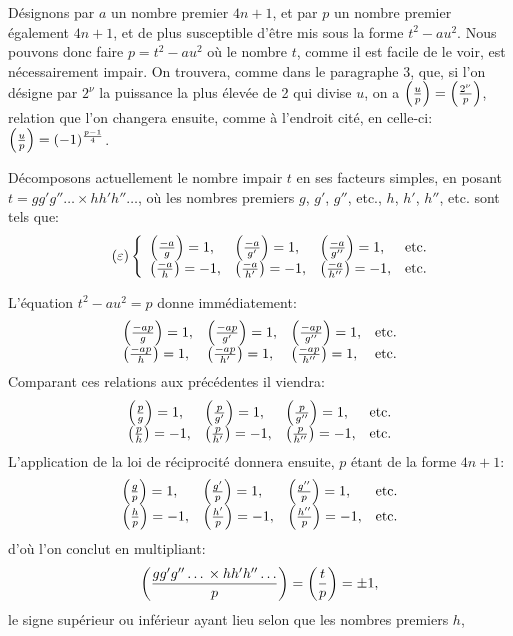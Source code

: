 \par\indent
Désignons par $a$ un nombre premier $4n+1$, et par $p$ un nombre premier également $4n+1$, et de
plus susceptible d'être mis sous la forme $t^2-au^2$. Nous pouvons donc faire $p=t^2-au^2$ où le
nombre $t$, comme il est facile de le voir, est nécessairement impair. On trouvera, comme dans le
paragraphe 3, que, si l'on désigne par $2^\nu$ la puissance la plus élevée de 2 qui divise $u$, on
a $\left(\frac{u}{p}\right)=\left(\frac{2^\nu}{p}\right)$, relation que l'on changera ensuite, comme à l'endroit cité, en
celle-ci: $\left(\frac{u}{p}\right)=(-1)^{\frac{p-1}{4}}$.
\par\indent
Décomposons actuellement le nombre impair $t$ en ses facteurs simples, en posant
$t=gg'g''\ldots{}\times hh'h''\ldots$, où les nombres premiers $g$, $g'$, $g''$, etc., $h$, $h'$,
$h''$, etc. sont tels que:
\begin{equation*}\tag{$\varepsilon$}
\left\{
\begin{array}{llll}
\left(\frac{-a}{g}\right)=1,& \left(\frac{-a}{g'}\right)=1,& \left(\frac{-a}{g''}\right)=1,& \text{etc.}\\[0.3em]
\left(\frac{-a}{h}\right)=-1,& \left(\frac{-a}{h'}\right)=-1,& \left(\frac{-a}{h''}\right)=-1,& \text{etc.}
\end{array}
\right.
\end{equation*}
\par\noindent
L'équation $t^2-au^2=p$ donne immédiatement:
\[
\begin{array}{llll}
\left(\frac{-ap}{g}\right)=1,& \left(\frac{-ap}{g'}\right)=1,& \left(\frac{-ap}{g''}\right)=1,& \text{etc.}\\[0.3em]
\left(\frac{-ap}{h}\right)=1,& \left(\frac{-ap}{h'}\right)=1,& \left(\frac{-ap}{h''}\right)=1,& \text{etc.}
\end{array}
\]
Comparant ces relations aux précédentes il viendra:
\[
\begin{array}{llll}
\left(\frac{p}{g}\right)=1,& \left(\frac{p}{g'}\right)=1,& \left(\frac{p}{g''}\right)=1,& \text{etc.}\\[0.3em]
\left(\frac{p}{h}\right)=-1,& \left(\frac{p}{h'}\right)=-1,& \left(\frac{p}{h''}\right)=-1,& \text{etc.}
\end{array}
\]
L'application de la loi de réciprocité donnera ensuite, $p$ étant de la forme $4n+1$:
\[
\begin{array}{llll}
\left(\frac{g}{p}\right)=1,& \left(\frac{g'}{p}\right)=1,& \left(\frac{g''}{p}\right)=1,& \text{etc.}\\[0.3em]
\left(\frac{h}{p}\right)=-1,& \left(\frac{h'}{p}\right)=-1,& \left(\frac{h''}{p}\right)=-1,& \text{etc.}
\end{array}
\]
d'où l'on conclut en multipliant:
\[
\left(\frac{gg'g''\ldots{}\times hh'h''\ldots}{p}\right)=\left(\frac{t}{p}\right)=\pm1,
\]
le signe supérieur ou inférieur ayant lieu selon que les nombres premiers $h$,
